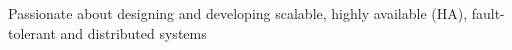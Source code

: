 

\begin{cvparagraph}

Passionate about designing and developing scalable, highly available (HA), fault-tolerant and distributed systems
\end{cvparagraph}
